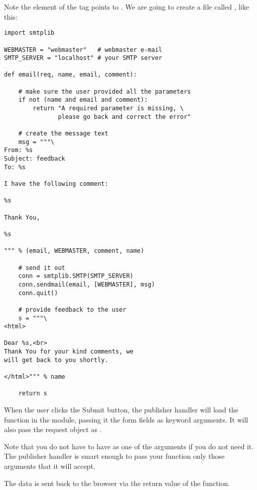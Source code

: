 Note the  element of the  tag points to
. We are going to create a file called
, like this:

\begin{verbatim}
import smtplib

WEBMASTER = "webmaster"   # webmaster e-mail
SMTP_SERVER = "localhost" # your SMTP server

def email(req, name, email, comment):

    # make sure the user provided all the parameters
    if not (name and email and comment):
        return "A required parameter is missing, \
               please go back and correct the error"

    # create the message text
    msg = """\
From: %s                                                                                                                                           
Subject: feedback
To: %s

I have the following comment:

%s

Thank You,

%s

""" % (email, WEBMASTER, comment, name)

    # send it out
    conn = smtplib.SMTP(SMTP_SERVER)
    conn.sendmail(email, [WEBMASTER], msg)
    conn.quit()

    # provide feedback to the user
    s = """\
<html>

Dear %s,<br>                                                                                                                                       
Thank You for your kind comments, we
will get back to you shortly.

</html>""" % name

    return s
\end{verbatim}

When the user clicks the Submit button, the publisher handler will
load the  function in the  module,
passing it the form fields as keyword arguments. It will also pass the
request object as .

Note that you do not have to have \code{req} as one of the arguments
if you do not need it. The publisher handler is smart enough to pass
your function only those arguments that it will accept.

The data is sent back to the browser via the return value of the
function.

